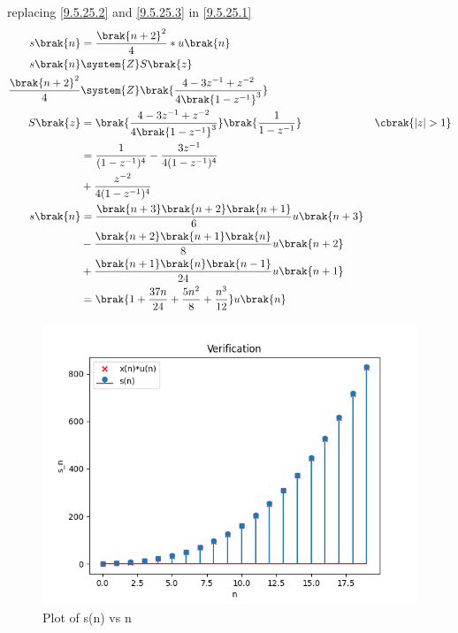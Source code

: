 \documentclass[journal,12pt,twocolumn]{article}
\begin{document}
replacing \eqref{9.5.25.2} and \eqref{9.5.25.3} in \eqref{9.5.25.1}
\begin{align}
    s\brak{n}& = \frac{\brak{n+2}^2}{4} * u\brak{n} \\
    s\brak{n} & \system{Z} S\brak{z} \\
	\frac{\brak{n+2}^2}{4} & \system{Z} \brak{\frac{4 -3z^{-1} + z^{-2}}{4\brak{1-z^{-1}}^3}}\\ 
    S\brak{z} & = \brak{\frac{4 -3z^{-1} + z^{-2}}{4\brak{1-z^{-1}}^3}} \brak{\frac{1}{1-z^{-1}}} & \cbrak{|z|>1}\\
    & = \frac{1}{(1 - z^{-1})^4} - \frac{3z^{-1}}{4(1 - z^{-1})^4}\notag\\
    & + \frac{z^{-2}}{4(1 - z^{-1})^4}\\
    s\brak{n} & = \frac{\brak{n + 3} \brak{n + 2}\brak{n+1}}{6}u\brak{n+3}\notag\\
    & - \frac{\brak{n + 2} \brak{n + 1}\brak{n}}{8}u\brak{n+2}\notag\\
    & + \frac{\brak{n + 1} \brak{n}\brak{n-1}}{24}u\brak{n+1}\\
    & = \brak{1 + \frac{37n}{24} + \frac{5n^2}{8} + \frac{n^3}{12}} u\brak{n} 
\end{align}

\begin{figure}[h!]
   \centering
   \includegraphics[width=1\columnwidth]{ncert-maths/11/9/5/25/figs/plot.png}
   \caption{Plot of s(n) vs n}
   \label {fig: 11.9.5.25.1}
\end{figure}
\end{document}
